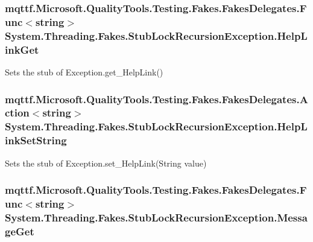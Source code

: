 \hypertarget{class_system_1_1_threading_1_1_fakes_1_1_stub_lock_recursion_exception_aa3812dfe3282499851c6002d4f203252}{
\subsubsection[{Help\-Link\-Get}]{\setlength{\rightskip}{0pt plus 5cm}mqttf.\-Microsoft.\-Quality\-Tools.\-Testing.\-Fakes.\-Fakes\-Delegates.\-Func$<$string$>$ System.\-Threading.\-Fakes.\-Stub\-Lock\-Recursion\-Exception.\-Help\-Link\-Get}}\label{class_system_1_1_threading_1_1_fakes_1_1_stub_lock_recursion_exception_aa3812dfe3282499851c6002d4f203252}


Sets the stub of Exception.\-get\-\_\-\-Help\-Link()

\hypertarget{class_system_1_1_threading_1_1_fakes_1_1_stub_lock_recursion_exception_a969f4776fd495105bf88f0c4df864ec1}{
\subsubsection[{Help\-Link\-Set\-String}]{\setlength{\rightskip}{0pt plus 5cm}mqttf.\-Microsoft.\-Quality\-Tools.\-Testing.\-Fakes.\-Fakes\-Delegates.\-Action$<$string$>$ System.\-Threading.\-Fakes.\-Stub\-Lock\-Recursion\-Exception.\-Help\-Link\-Set\-String}}\label{class_system_1_1_threading_1_1_fakes_1_1_stub_lock_recursion_exception_a969f4776fd495105bf88f0c4df864ec1}


Sets the stub of Exception.\-set\-\_\-\-Help\-Link(\-String value)

\hypertarget{class_system_1_1_threading_1_1_fakes_1_1_stub_lock_recursion_exception_ab0d4dd152b4206c59c0cb4f0ba79182a}{
\subsubsection[{Message\-Get}]{\setlength{\rightskip}{0pt plus 5cm}mqttf.\-Microsoft.\-Quality\-Tools.\-Testing.\-Fakes.\-Fakes\-Delegates.\-Func$<$string$>$ System.\-Threading.\-Fakes.\-Stub\-Lock\-Recursion\-Exception.\-Message\-Get}}\label{class_system_1_1_threading_1_1_fakes_1_1_stub_lock_recursion_exception_ab0d4dd152b4206c59c0cb4f0ba79182a}


